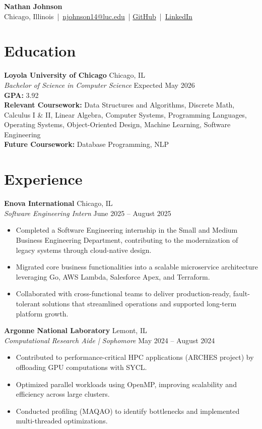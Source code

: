 \documentclass[a4paper,10pt]{article}
\begin{document}
\begin{center}
    {\LARGE \textbf{Nathan Johnson}}\\
    Chicago, Illinois \,|\, \href{mailto:njohnson14@luc.edu}{njohnson14@luc.edu} \,| 
    \href{https://github.com/nathanjohnsongithub}{GitHub} \,|\, \href{https://www.linkedin.com/in/nathan-johnson-compsci/}{LinkedIn}
\end{center}

\section*{Education}
\textbf{Loyola University of Chicago} \hfill Chicago, IL\\
\textit{Bachelor of Science in Computer Science} \hfill Expected May 2026\\
\textbf{GPA:} 3.92\\
\textbf{Relevant Coursework:} Data Structures and Algorithms, Discrete Math, Calculus I \& II, Linear Algebra, Computer Systems, Programming Languages, Operating Systems, Object-Oriented Design, Machine Learning, Software Engineering\\
\textbf{Future Coursework:} Database Programming, NLP

\section*{Experience}

\textbf{Enova International} \hfill Chicago, IL\\
\textit{Software Engineering Intern} \hfill June 2025 -- August 2025
\begin{itemize}
    \item Completed a Software Engineering internship in the Small and Medium Business Engineering Department, contributing to the modernization of legacy systems through cloud-native design.
    \item Migrated core business functionalities into a scalable microservice architecture leveraging Go, AWS Lambda, Salesforce Apex, and Terraform.
    \item Collaborated with cross-functional teams to deliver production-ready, fault-tolerant solutions that streamlined operations and supported long-term platform growth.
\end{itemize}

\vspace{0.5em}

\textbf{Argonne National Laboratory} \hfill Lemont, IL\\
\textit{Computational Research Aide | Sophomore} \hfill May 2024 -- August 2024
\begin{itemize}
    \item Contributed to performance-critical HPC applications (ARCHES project) by offloading GPU computations with SYCL.
    \item Optimized parallel workloads using OpenMP, improving scalability and efficiency across large clusters.
    \item Conducted profiling (MAQAO) to identify bottlenecks and implemented multi-threaded optimizations.
\end{itemize}
\end{document}
